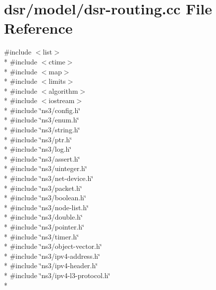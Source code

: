 \hypertarget{dsr-routing_8cc}{}\section{dsr/model/dsr-\/routing.cc File Reference}
\label{dsr-routing_8cc}
{\ttfamily \#include $<$list$>$}\\*
{\ttfamily \#include $<$ctime$>$}\\*
{\ttfamily \#include $<$map$>$}\\*
{\ttfamily \#include $<$limits$>$}\\*
{\ttfamily \#include $<$algorithm$>$}\\*
{\ttfamily \#include $<$iostream$>$}\\*
{\ttfamily \#include \char`\"{}ns3/config.\+h\char`\"{}}\\*
{\ttfamily \#include \char`\"{}ns3/enum.\+h\char`\"{}}\\*
{\ttfamily \#include \char`\"{}ns3/string.\+h\char`\"{}}\\*
{\ttfamily \#include \char`\"{}ns3/ptr.\+h\char`\"{}}\\*
{\ttfamily \#include \char`\"{}ns3/log.\+h\char`\"{}}\\*
{\ttfamily \#include \char`\"{}ns3/assert.\+h\char`\"{}}\\*
{\ttfamily \#include \char`\"{}ns3/uinteger.\+h\char`\"{}}\\*
{\ttfamily \#include \char`\"{}ns3/net-\/device.\+h\char`\"{}}\\*
{\ttfamily \#include \char`\"{}ns3/packet.\+h\char`\"{}}\\*
{\ttfamily \#include \char`\"{}ns3/boolean.\+h\char`\"{}}\\*
{\ttfamily \#include \char`\"{}ns3/node-\/list.\+h\char`\"{}}\\*
{\ttfamily \#include \char`\"{}ns3/double.\+h\char`\"{}}\\*
{\ttfamily \#include \char`\"{}ns3/pointer.\+h\char`\"{}}\\*
{\ttfamily \#include \char`\"{}ns3/timer.\+h\char`\"{}}\\*
{\ttfamily \#include \char`\"{}ns3/object-\/vector.\+h\char`\"{}}\\*
{\ttfamily \#include \char`\"{}ns3/ipv4-\/address.\+h\char`\"{}}\\*
{\ttfamily \#include \char`\"{}ns3/ipv4-\/header.\+h\char`\"{}}\\*
{\ttfamily \#include \char`\"{}ns3/ipv4-\/l3-\/protocol.\+h\char`\"{}}\\*

